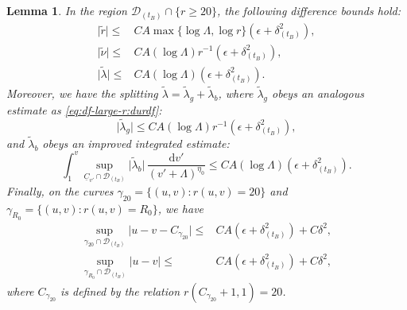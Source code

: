 \documentclass[10pt, reqno]{amsart}
\newtheorem{lemma}[theorem]{Lemma}
\theoremstyle{definition}
\theoremstyle{remark}
\theoremstyle{conjecture}
\numberwithin{equation}{section}
\newcommand{\abs}[1]{\vert#1\vert}
\newcommand{\set}[1]{\{#1\}}
\newcommand{\ud}{\mathrm{d}}
\newcommand{\0}{\emptyset}
\newcommand{\gmm}{\gamma}
\newcommand{\dlt}{\delta}
\newcommand{\eps}{\epsilon}
\newcommand{\lmb}{\lambda}
\newcommand{\Lmb}{\Lambda}
\newcommand{\calD}{\mathcal D}
\newcommand{\uC}{\underline{C}}
\newcommand{\dur}{\nu}
\newcommand{\dvr}{\lmb}
\newcommand{\dvrbg}{\overline{\dvr}}				%
\newcommand{\durbg}{\overline{\dur}}				%
\newcommand{\rbg}{\overline{r}}					%
\newcommand{\dvrdf}{\widetilde{\dvr}}				%
\newcommand{\durdf}{\widetilde{\dur}}				%
\newcommand{\rdf}{\widetilde{r}}					%
\begin{document}
\begin{lemma} \label{lem:df-large-r}
In the region $\calD_{(t_{B})} \cap \set{r \geq 20}$, the following difference bounds hold:
\begin{align} 
	\abs{\rdf} 
\leq & 	C A \max\set{\log \Lmb, \log r} \left( \eps + \dlt_{(t_{B})}^{2} \right),				\label{eq:df-large-r:rdf} \\
	\abs{\durdf} 
\leq & 	C A (\log \Lmb) r^{-1} \left( \eps +  \dlt_{(t_{B})}^{2}\right)	,			\label{eq:df-large-r:durdf} \\
	\abs{\dvrdf} 
\leq & 	C A (\log \Lmb) \left( \eps + \dlt_{(t_{B})}^{2}\right) .				\label{eq:df-large-r:dvrdf} 
\end{align}
Moreover, we have the splitting $\dvrdf = \dvrdf_{g} + \dvrdf_{b}$, where $\dvrdf_{g}$ obeys an analogous estimate as \eqref{eq:df-large-r:durdf}:
\begin{equation} \label{eq:df-large-r:dvr-g} 
	\abs{\dvrdf_{g}} 
\leq  	C A (\log \Lmb) r^{-1} \left( \eps + \dlt_{(t_{B})}^{2}\right) ,				
\end{equation}
and $\dvrdf_{b}$ obeys an improved integrated estimate:
\begin{equation}\label{eq:df-large-r:dvr-b}
	\int_{1}^{v} \sup_{\uC_{v'} \cap \calD_{(t_{B})}} \abs{\dvrdf_{b}} \, \frac{\ud v'}{(v' + \Lmb)^{\eta_{0}}}
\leq  	C A (\log \Lmb) \left( \eps + \dlt_{(t_{B})}^{2}\right) .				
\end{equation}
Finally, on the curves $\gmm_{20} = \set{(u, v) : r(u, v) = 20}$ and $\gmm_{R_{0}} = \set{(u, v) : r(u, v) = R_{0}}$, we have
\begin{align} 
	\sup_{\gmm_{20} \cap \calD_{(t_{B})}} \abs{u - v - C_{\gmm_{20}}} 
\leq & 	C A (\eps + \dlt_{(t_{B})}^{2}) + C \dlt^{2}, 		\label{eq:df-large-r:v-u} \\
	\sup_{\gmm_{R_{0}} \cap \calD_{(t_{B})}} \abs{u - v}
\leq &	C A (\eps + \dlt_{(t_{B})}^{2}) + C \dlt^{2}, \label{eq:df-large-r:v-u-R0}
\end{align}
where $C_{\gmm_{20}}$ is defined by the relation $r(C_{\gmm_{20}} + 1, 1) = 20$.
\end{lemma}
\end{document}
